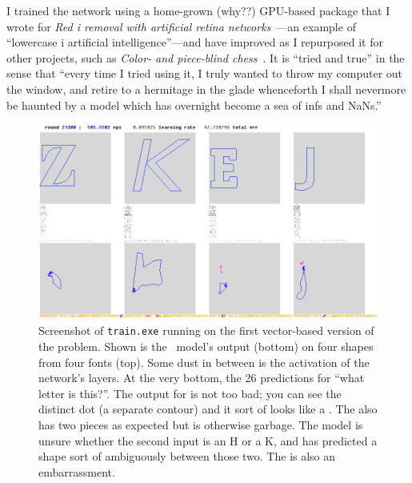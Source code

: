 \documentclass[twocolumn]{article}
\begin{document}
\newcommand\nan{\textsf{NaN}}
\renewcommand\inf{\textsf{inf}}

I trained the network using a home-grown (why??) GPU-based package
that I wrote for {\em Red i removal with artificial retina
  networks}~\cite{murphy2015redi}---an example of ``lowercase i
artificial intelligence''---and have improved as I repurposed it for
other projects, such as {\em Color- and piece-blind
  chess}~\cite{murphy2019blind}. It is ``tried and true'' in the
sense that ``every time I tried using it, I truly wanted to throw
my computer out the window, and retire to a hermitage in the glade
whenceforth I shall nevermore be haunted by a model which has
overnight become a sea of \inf{}s and \nan{}s.''

\begin{figure}[ht]
\centering
  \includegraphics[width=0.9 \linewidth]{trainingvector}
\caption{ Screenshot of {\tt train.exe} running on the first vector-based
  version of the problem. Shown is the \makelowercase\ model's output
  (bottom) on four shapes from four fonts (top). Some dust in between
  is the activation of the network's layers. At the very bottom, the
  26 predictions for ``what letter is this?''. The output for
   is not too bad; you can see the distinct dot (a
  separate contour) and it sort of looks like a . The
   also has two pieces as expected but is otherwise
  garbage. The model is unsure whether the second input is an H
  or a K, and has predicted a shape sort of ambiguously between those
  two. The  is also an embarrassment.
} \label{fig:trainingvector}
\end{figure}
\end{document}
